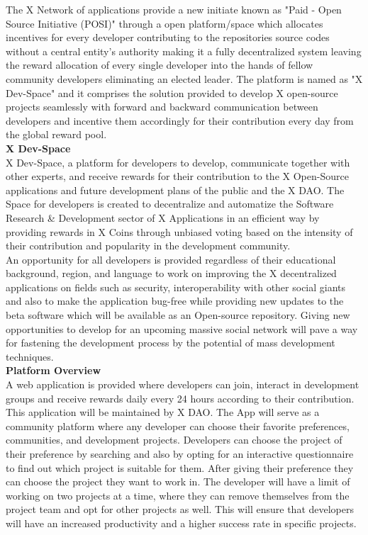 \documentclass[letterpaper,11pt]{article}
\begin{document}
The X Network of applications provide a new initiate known as "Paid - Open Source Initiative (POSI)" through a open platform/space which allocates incentives for every developer contributing to the repositories source codes without a central entity's authority making it a fully decentralized system leaving the reward allocation of every single developer into the hands of fellow community developers eliminating an elected leader. The platform is named as "X Dev-Space" and it comprises the solution provided to develop X open-source projects seamlessly with forward and backward communication between developers and incentive them accordingly for their contribution every day from the global reward pool.\\

\textbf{X Dev-Space}\\

X Dev-Space, a platform for developers to develop, communicate together with other experts, and receive rewards for their contribution to the X Open-Source applications and future development plans of the public and the X DAO. The Space for developers is created to decentralize and automatize the Software Research \& Development sector of X Applications in an efficient way by providing rewards in X Coins through unbiased voting based on the intensity of their contribution and popularity in the development community.\\

An opportunity for all developers is provided regardless of their educational background, region, and language to work on improving the X decentralized applications on fields such as security, interoperability with other social giants and also to make the application bug-free while providing new updates to the beta software which will be available as an Open-source repository. Giving new opportunities to develop for an upcoming massive social network will pave a way for fastening the development process by the potential of mass development techniques.\\


\textbf{Platform Overview}\\

A web application is provided where developers can join, interact in development groups and receive rewards daily every 24 hours according to their contribution. This application will be maintained by X DAO. The App will serve as a community platform where any developer can choose their favorite preferences, communities, and development projects. Developers can choose the project of their preference by searching and also by opting for an interactive questionnaire to find out which project is suitable for them. After giving their preference they can choose the project they want to work in. The developer will have a limit of working on two projects at a time, where they can remove themselves from the project team and opt for other projects as well. This will ensure that developers will have an increased productivity and a higher success rate in specific projects.\\
\end{document}
